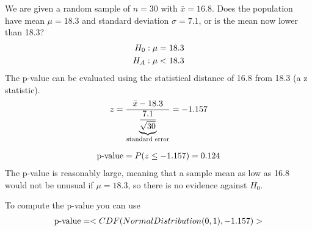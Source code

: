 \begin{example}
    We are given a random sample of $n=30$ with $\bar{x}=16.8$. Does the population have mean $\mu=18.3$ and standard deviation $\sigma=7.1$, or is the mean now lower than 18.3?
    \begin{align}
        H_0: \mu &= 18.3 \notag \\
        H_A: \mu &< 18.3 \notag
    \end{align}
    The p-value can be evaluated using the statistical distance of 16.8 from 18.3 (a z statistic).
    \begin{align}
        z = \frac{\bar{x} - 18.3}{\underbrace{\frac{7.1}{\sqrt{30}}}_{\text{standard error}}} = -1.157 \notag
    \end{align}
    \begin{center}
    \end{center}
    \begin{align}
        \text{p-value} = P(z \le -1.157) = 0.124 \notag
    \end{align}
    The p-value is reasonably large, meaning that a sample mean as low as 16.8 would not be unusual if $\mu=18.3$, so there is no evidence against $H_0$.
\end{example}

\begin{*anmerkung}
	To compute the p-value you can use
	\begin{align}
		\text{p-value} = \texttt{CDF(NormalDistribution(0,1),-1.157)}\notag
	\end{align}
\end{*anmerkung}

